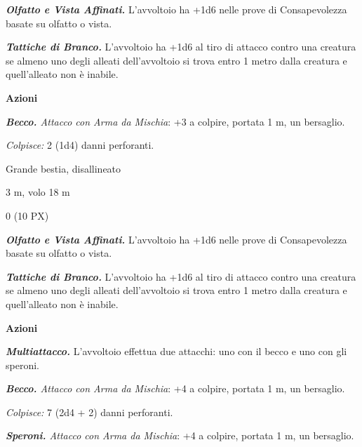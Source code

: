 \begin{multicols}{2}
{\emph{\textbf{Olfatto e Vista Affinati.}} L'avvoltoio ha +1d6 nelle prove di Consapevolezza basate su olfatto o vista.

\emph{\textbf{Tattiche di Branco.}} L'avvoltoio ha +1d6 al tiro di attacco contro una creatura se almeno uno degli alleati dell'avvoltoio si trova entro 1 metro dalla creatura e quell'alleato non è inabile.

\textbf{Azioni}

\emph{\textbf{Becco.} Attacco con Arma da Mischia}: +3 a colpire, portata 1 m, un bersaglio.

\emph{Colpisce:} 2 (1d4) danni perforanti.

\begin{description}[noitemsep, topsep=0pt, parsep=0pt, partopsep=0pt, itemsep=1pt, leftmargin=2.35cm,  labelwidth=2.2cm, itemindent=0cm, listparindent=0pt] %
\setlength{\baselineskip}{10pt}
\item[\textbf{Taglia/Tipo}] Grande bestia, disallineato
\item[\textbf{Caratt.}] 
\item[\textbf{Punti Ferita}] 
\item[\textbf{Tiri Salvez.}] 
\item[\textbf{Movimento}] 3 m, volo 18 m
\item[\textbf{Sfida}] 0 (10 PX)
\end{description}
\smallskip

\emph{\textbf{Olfatto e Vista Affinati.}} L'avvoltoio ha +1d6 nelle prove di Consapevolezza basate su olfatto o vista.

\emph{\textbf{Tattiche di Branco.}} L'avvoltoio ha +1d6 al tiro di attacco contro una creatura se almeno uno degli alleati dell'avvoltoio si trova entro 1 metro dalla creatura e quell'alleato non è inabile.

\textbf{Azioni}

\emph{\textbf{Multiattacco.}} L'avvoltoio effettua due attacchi: uno con il becco e uno con gli speroni.

\emph{\textbf{Becco.} Attacco con Arma da Mischia}: +4 a colpire, portata 1 m, un bersaglio.

\emph{Colpisce:} 7 (2d4 + 2) danni perforanti.

\emph{\textbf{Speroni.} Attacco con Arma da Mischia}: +4 a colpire, portata 1 m, un bersaglio.

}
\end{multicols}
